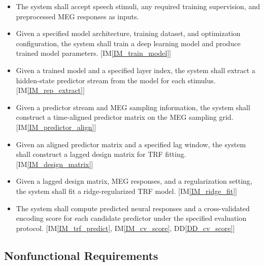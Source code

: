 \documentclass[12pt]{article}
\begin{document}
\begin{itemize}
  \item[R1:] \label{R_accept_inputs}
  The system shall accept speech stimuli, any required training supervision, and preprocessed MEG responses as inputs.

  \item[R2:] \label{R_train_model}
  Given a specified model architecture, training dataset, and optimization configuration, the system shall train a deep learning model and produce trained model parameters. [IM\ref{IM_train_model}]

  \item[R3:] \label{R_extract_predictor}
  Given a trained model and a specified layer index, the system shall extract a hidden-state predictor stream from the model for each stimulus. [IM\ref{IM_rep_extract}]

  \item[R4:] \label{R_align_predictor}
  Given a predictor stream and MEG sampling information, the system shall construct a time-aligned predictor matrix on the MEG sampling grid. [IM\ref{IM_predictor_align}]

  \item[R5:] \label{R_build_design_matrix}
  Given an aligned predictor matrix and a specified lag window, the system shall construct a lagged design matrix for TRF fitting. [IM\ref{IM_design_matrix}]

  \item[R6:] \label{R_fit_trf}
  Given a lagged design matrix, MEG responses, and a regularization setting, the system shall fit a ridge-regularized TRF model. [IM\ref{IM_ridge_fit}]

  \item[R7:] \label{R_predict_and_score}
  The system shall compute predicted neural responses and a cross-validated encoding score for each candidate predictor under the specified evaluation protocol. [IM\ref{IM_trf_predict}, IM\ref{IM_cv_score}, DD\ref{DD_cv_score}]
\end{itemize}




\subsection{Nonfunctional Requirements}
\end{document}
